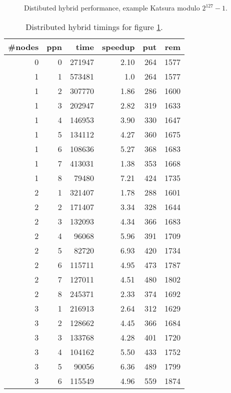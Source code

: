 \documentclass[10pt,twocolumn,a4paper]{article}
\begin{document}
\begin{figure}[thb]
\centering
{}
\caption{Distibuted hybrid performance, example Katsura modulo $2^{127}-1$.}
\label{fig:k8m1hybrid}
\end{figure}

\begin{table}[thb]
\centering
\caption{Distributed hybrid timings for figure \ref{fig:k8m1hybrid}.}
\label{fig:kat8_distm1}
\small{
\clearpage{}
\begin{tabular}{|r|r|r|r|r|r|}
\hline
\#nodes & ppn & time & speedup & put & rem 
\\ \hline
 0 & 0 & 271947 & 2.10 & 264 & 1577
\\ \hline
 1 & 1 & 573481 & 1.0 & 264 & 1577
\\ \hline
 1 & 2 & 307770 & 1.86 & 286 & 1600
\\ \hline
 1 & 3 & 202947 & 2.82 & 319 & 1633
\\ \hline
 1 & 4 & 146953 & 3.90 & 330 & 1647
\\ \hline
 1 & 5 & 134112 & 4.27 & 360 & 1675
\\ \hline
 1 & 6 & 108636 & 5.27 & 368 & 1683
\\ \hline
 1 & 7 & 413031 & 1.38 & 353 & 1668
\\ \hline
 1 & 8 & 79480  & 7.21 & 424 & 1735
\\ \hline
 2 & 1 & 321407 & 1.78 & 288 & 1601
\\ \hline
 2 & 2 & 171407 & 3.34 & 328 & 1644
\\ \hline
 2 & 3 & 132093 & 4.34 & 366 & 1683
\\ \hline
 2 & 4 & 96068  & 5.96 & 391 & 1709
\\ \hline
 2 & 5 & 82720  & 6.93 & 420 & 1734
\\ \hline
 2 & 6 & 115711 & 4.95 & 473 & 1787
\\ \hline
 2 & 7 & 127011 & 4.51 & 480 & 1802
\\ \hline
 2 & 8 & 245371 & 2.33 & 374 & 1692
\\ \hline
 3 & 1 & 216913 & 2.64 & 312 & 1629
\\ \hline
 3 & 2 & 128662 & 4.45 & 366 & 1684
\\ \hline
 3 & 3 & 133768 & 4.28 & 401 & 1720
\\ \hline
 3 & 4 & 104162 & 5.50 & 433 & 1752
\\ \hline
 3 & 5 & 90056  & 6.36 & 489 & 1799
\\ \hline
 3 & 6 & 115549 & 4.96 & 559 & 1874

\end{tabular}}
\end{table}
\end{document}
